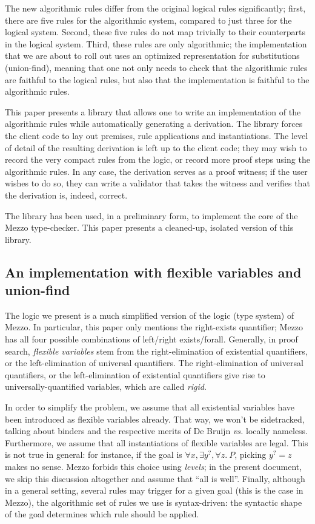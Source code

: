 \documentclass{easychair}
\newcommand{\f}[1]{\ensuremath{#1^?}} %
\begin{document}
The new algorithmic rules differ from the original logical rules significantly;
first, there are five rules for the algorithmic system, compared to just three
for the logical system. Second, these five rules do not map trivially to their
counterparts in the logical system. Third, these rules are only
algorithmic; the implementation that we are about to roll out uses an
optimized representation for substitutions (union-find), meaning that one not
only needs to check that the algorithmic rules are faithful to the logical
rules, but also that the implementation is faithful to the algorithmic rules.

This paper presents a library that allows one to write an implementation of the
algorithmic rules while automatically generating a derivation. The library
forces the client code to lay out premises, rule applications and
instantiations. The level of detail of the resulting derivation is left up to
the client code; they may wish to record the very compact rules from the logic,
or record more proof steps using the algorithmic rules. In any case, the
derivation serves as a proof witness; if the user wishes to do so, they can
write a validator that takes the witness and verifies that the derivation is,
indeed, correct.

The library has been used, in a preliminary form, to implement the core of the
Mezzo type-checker. This paper presents a cleaned-up, isolated version of this
library.

\subsection{An implementation with flexible variables and union-find}

The logic we present is a much simplified version of the logic (type system)
of Mezzo. In particular, this paper only mentions the right-exists quantifier;
Mezzo has all four possible combinations of left/right exists/forall. Generally,
in proof search, \emph{flexible variables} stem from the right-elimination of
existential quantifiers, or the left-elimination of universal quantifiers. The
right-elimination of universal quantifiers, or the left-elimination of
existential quantifiers give rise to universally-quantified variables, which are
called \emph{rigid}.

In order to simplify the problem, we assume that all existential variables have
been introduced as flexible variables already. That way, we won't be
sidetracked, talking about binders and the respective merits of De Bruijn
\emph{vs.} locally nameless. Furthermore, we assume that all instantiations of
flexible variables are legal. This is not true in general: for instance, if the
goal is $\forall x, \exists \f y, \forall z.\ P$, picking $\f y = z$ makes no
sense. Mezzo forbids this choice using \emph{levels}; in the present document,
we skip this discussion altogether and assume that ``all is well''. Finally,
although in a general setting, several rules may trigger for a given goal (this
is the case in Mezzo), the algorithmic set of rules we use is syntax-driven: the
syntactic shape of the goal determines which rule should be applied.
\end{document}
